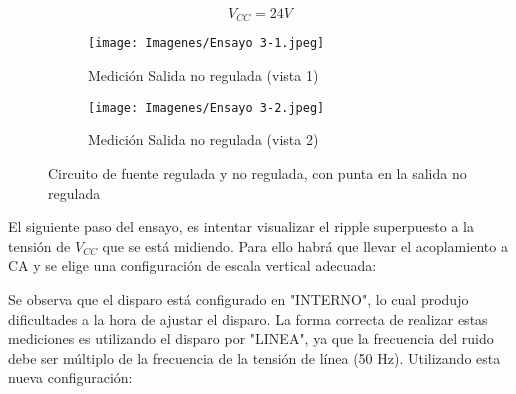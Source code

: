 $$V_{CC} = 24V$$

\begin{figure}[H]
        \begin{subfigure}[b]{0.5\textwidth}
        \centering  
        \texttt{[image: Imagenes/Ensayo 3-1.jpeg]}
        \caption{Medición Salida no regulada (vista 1)}
        \label{fig::MedSalNoRegulada1}
    \end{subfigure}
    \hfill
    \begin{subfigure}[b]{0.49\textwidth}
        \centering
        \texttt{[image: Imagenes/Ensayo 3-2.jpeg]}
        \caption{Medición Salida no regulada (vista 2)}
        \label{fig::MedSalNoRegulada2}
    \end{subfigure}
    \caption{Circuito de fuente regulada y no regulada, con punta en la salida no regulada}
\end{figure}


El siguiente paso del ensayo, es intentar visualizar el ripple superpuesto a la tensión de $V_{CC}$ que se está midiendo. Para ello habrá que llevar el acoplamiento a CA y se elige una configuración de escala vertical adecuada:

\begin{table}[H]
    \centering
        \def\tablename{Tabla} 
        \caption{Cuadro de Controles}
        \label{tab:cont3b}
\end{table}

Se observa que el disparo está configurado en "INTERNO", lo cual produjo dificultades a la hora de ajustar el disparo. La forma correcta de realizar estas mediciones es utilizando el disparo por "LINEA", ya que la frecuencia del ruido debe ser múltiplo de la frecuencia de la tensión de línea (50 Hz). Utilizando esta nueva configuración:

\begin{table}[H]
    \centering
        \def\tablename{Tabla} 
        \caption{Cuadro de Controles}
        \label{tab:cont3c}
\end{table}

